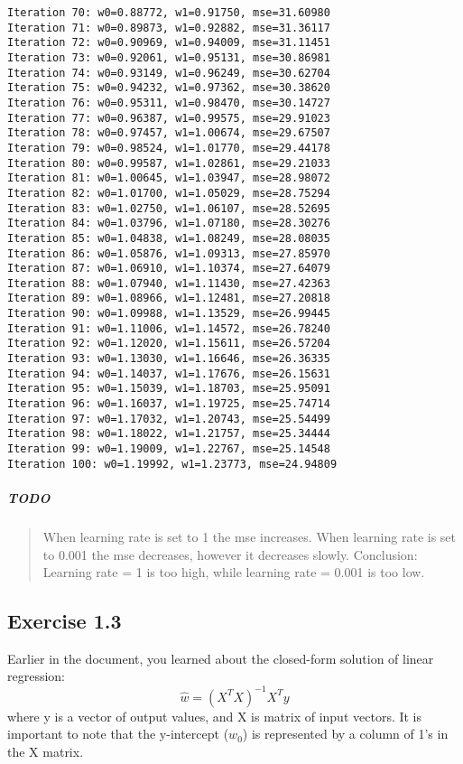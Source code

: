 \documentclass[11pt]{article}
\begin{document}
\begin{Verbatim}[commandchars=\\\{\}]
Iteration 70: w0=0.88772, w1=0.91750, mse=31.60980
Iteration 71: w0=0.89873, w1=0.92882, mse=31.36117
Iteration 72: w0=0.90969, w1=0.94009, mse=31.11451
Iteration 73: w0=0.92061, w1=0.95131, mse=30.86981
Iteration 74: w0=0.93149, w1=0.96249, mse=30.62704
Iteration 75: w0=0.94232, w1=0.97362, mse=30.38620
Iteration 76: w0=0.95311, w1=0.98470, mse=30.14727
Iteration 77: w0=0.96387, w1=0.99575, mse=29.91023
Iteration 78: w0=0.97457, w1=1.00674, mse=29.67507
Iteration 79: w0=0.98524, w1=1.01770, mse=29.44178
Iteration 80: w0=0.99587, w1=1.02861, mse=29.21033
Iteration 81: w0=1.00645, w1=1.03947, mse=28.98072
Iteration 82: w0=1.01700, w1=1.05029, mse=28.75294
Iteration 83: w0=1.02750, w1=1.06107, mse=28.52695
Iteration 84: w0=1.03796, w1=1.07180, mse=28.30276
Iteration 85: w0=1.04838, w1=1.08249, mse=28.08035
Iteration 86: w0=1.05876, w1=1.09313, mse=27.85970
Iteration 87: w0=1.06910, w1=1.10374, mse=27.64079
Iteration 88: w0=1.07940, w1=1.11430, mse=27.42363
Iteration 89: w0=1.08966, w1=1.12481, mse=27.20818
Iteration 90: w0=1.09988, w1=1.13529, mse=26.99445
Iteration 91: w0=1.11006, w1=1.14572, mse=26.78240
Iteration 92: w0=1.12020, w1=1.15611, mse=26.57204
Iteration 93: w0=1.13030, w1=1.16646, mse=26.36335
Iteration 94: w0=1.14037, w1=1.17676, mse=26.15631
Iteration 95: w0=1.15039, w1=1.18703, mse=25.95091
Iteration 96: w0=1.16037, w1=1.19725, mse=25.74714
Iteration 97: w0=1.17032, w1=1.20743, mse=25.54499
Iteration 98: w0=1.18022, w1=1.21757, mse=25.34444
Iteration 99: w0=1.19009, w1=1.22767, mse=25.14548
Iteration 100: w0=1.19992, w1=1.23773, mse=24.94809

    \end{Verbatim}

    \hypertarget{todo}{%
\subparagraph{TODO}\label{todo}}

\begin{quote}
When learning rate is set to 1 the mse increases. When learning rate is
set to 0.001 the mse decreases, however it decreases slowly. Conclusion:
Learning rate = 1 is too high, while learning rate = 0.001 is too low.
\end{quote}

    \hypertarget{exercise-1.3}{%
\subsection{Exercise 1.3}\label{exercise-1.3}}

Earlier in the document, you learned about the closed-form solution of
linear regression: \[
\hat{w} = (X^TX)^{-1}X^Ty
\] where y is a vector of output values, and X is matrix of input
vectors. It is important to note that the y-intercept (\(w_0\)) is
represented by a column of 1's in the X matrix.
\end{document}
